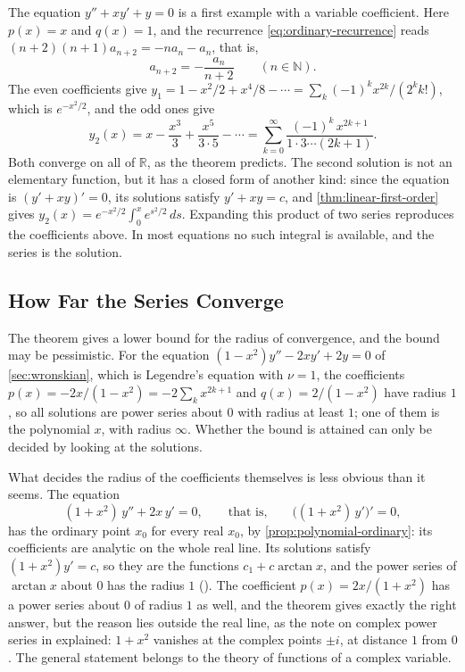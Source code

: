 The equation $y''+xy'+y=0$ is a first example with a variable coefficient. Here $p(x)=x$ and $q(x)=1$, and the recurrence \eqref{eq:ordinary-recurrence} reads $(n+2)(n+1)a_{n+2}=-na_n-a_n$, that is,
\[
a_{n+2}=-\frac{a_n}{n+2}\qquad(n\in\mathbb N).
\]
The even coefficients give $y_1=1-x^2/2+x^4/8-\cdots=\sum_k(-1)^kx^{2k}/(2^kk!)$, which is $e^{-x^2/2}$, and the odd ones give
\[
y_2(x)=x-\frac{x^3}3+\frac{x^5}{3\cdot5}-\cdots=\sum_{k=0}^\infty\frac{(-1)^k\,x^{2k+1}}{1\cdot3\cdots(2k+1)} .
\]
Both converge on all of $\mathbb R$, as the theorem predicts. The second solution is not an elementary function, but it has a closed form of another kind: since the equation is $(y'+xy)'=0$, its solutions satisfy $y'+xy=c$, and \cref{thm:linear-first-order} gives $y_2(x)=e^{-x^2/2}\int_0^xe^{s^2/2}\,ds$. Expanding this product of two series reproduces the coefficients above. In most equations no such integral is available, and the series is the solution.

\subsection{How Far the Series Converge}

The theorem gives a lower bound for the radius of convergence, and the bound may be pessimistic. For the equation $(1-x^2)y''-2xy'+2y=0$ of \cref{sec:wronskian}, which is Legendre's equation with $\nu=1$, the coefficients $p(x)=-2x/(1-x^2)=-2\sum_kx^{2k+1}$ and $q(x)=2/(1-x^2)$ have radius $1$, so all solutions are power series about $0$ with radius at least $1$; one of them is the polynomial $x$, with radius $\infty$. Whether the bound is attained can only be decided by looking at the solutions.

What decides the radius of the coefficients themselves is less obvious than it seems. The equation
\[
(1+x^2)\,y''+2x\,y'=0,\qquad\text{that is,}\qquad\bigl((1+x^2)\,y'\bigr)'=0 ,
\]
has the ordinary point $x_0$ for every real $x_0$, by \cref{prop:polynomial-ordinary}: its coefficients are analytic on the whole real line. Its solutions satisfy $(1+x^2)y'=c$, so they are the functions $c_1+c\arctan x$, and the power series of $\arctan x$ about $0$ has the radius $1$ (). The coefficient $p(x)=2x/(1+x^2)$ has a power series about $0$ of radius $1$ as well, and the theorem gives exactly the right answer, but the reason lies outside the real line, as the note on complex power series in  explained: $1+x^2$ vanishes at the complex points $\pm i$, at distance $1$ from $0$. The general statement belongs to the theory of functions of a complex variable.

